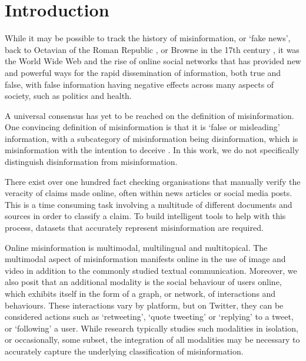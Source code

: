 \documentclass[sigconf,natbib=true,anonymous=false,nonacm]{acmart}
\begin{document}





\maketitle


\section{Introduction}
\label{sec:introduction}

While it may be possible to track the history of misinformation, or `fake
news', back to Octavian of the Roman Republic \citep{watson2018information}, or
Browne in the 17th century \citep{browne1646pseudodoxia}, it was the World Wide
Web and the rise of online social networks that has provided new and powerful
ways for the rapid dissemination of information, both true and false, with
false information having negative effects across many aspects of society, such
as politics and health.

A universal consensus has yet to be reached on the definition of
misinformation. One convincing definition of misinformation is that it is
`false or misleading' information, with a subcategory of misinformation being
disinformation, which is misinformation with the intention to deceive
\citep{lazer2018fakenewsscience}. In this work, we do not specifically
distinguish disinformation from misinformation.

There exist over one hundred fact checking organisations that manually verify
the veracity of claims made online, often within news articles or social media
posts.  This is a time consuming task involving a multitude of different
documents and sources in order to classify a claim. To build intelligent tools
to help with this process,  datasets that accurately represent misinformation
are required.

Online misinformation is multimodal, multilingual and multitopical. The
multimodal aspect of misinformation manifests online in the use of image and
video in addition to the commonly studied textual communication. Moreover, we
also posit that an additional modality is the social behaviour of users online,
which exhibits itself in the form of a graph, or network, of interactions and
behaviours. These interactions vary by platform, but on Twitter, they can be
considered actions such as `retweeting', `quote tweeting' or `replying' to a
tweet, or `following' a user. While research typically studies such modalities
in isolation, or occasionally, some subset, the integration of all modalities
may be necessary to accurately capture the underlying classification of
misinformation.
\end{document}
